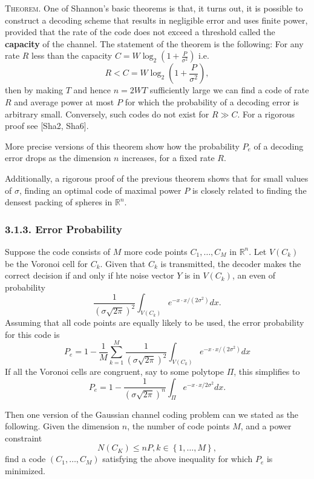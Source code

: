 \documentclass{article}
\newcommand{\R}{\mathbb{R}}
\renewcommand{\=}{\equiv}
\newcommand{\ass}[1]{\left( #1 \right)}
\newcommand{\set}[1]{\left\{ #1 \right\}}
\newcommand{\header}[1]{\vspace{1em}\noindent\textsc{#1.} }
\begin{document}
\header{Theorem}
One of Shannon's basic theorems is that, it turns out, it is possible to construct a decoding scheme that results in negligible error and uses finite power, provided that the rate of the code does not exceed a threshold called the \textbf{capacity} of the channel.
The statement of the theorem is the following:
For any rate $R$ less than the capacity $C = W \log_2 \ass{1 + \frac{P}{\sigma^2}}$ i.e.
$$ R < C = W \log_2 \ass{1 + \frac{P}{\sigma^2}}, $$
then by making $T$ and hence $n = 2WT$ sufficiently large we can find a code of rate $R$ and average power at most $P$ for which the probability of a decoding error is arbitrary small.
Conversely, such codes do not exist for $R \gg C$.
For a rigorous proof see [Sha2, Sha6].

More precise versions of this theorem show how the probability $P_e$ of a decoding error drops as the dimension $n$ increases, for a fixed rate $R$.

Additionally, a rigorous proof of the previous theorem shows that for small values of $\sigma$, finding an optimal code of maximal power $P$ is closely related to finding the densest packing of spheres in $\R^n$.

\subsubsection*{3.1.3. Error Probability}

Suppose the code consists of $M$ more code points $C_1, \dots, C_M$ in $\R^n$.
Let $V(C_k)$ be the Voronoi cell for $C_k$.
Given that $C_k$ is transmitted, the decoder makes the correct decision if and only if hte noise vector $Y$ is in $V(C_k)$, an even of probability
$$ \frac{1}{(\sigma \sqrt{2\pi})^2} \int_{V(C_k)} e^{-x \cdot x/(2\sigma^2)} dx. $$
Assuming that all code points are equally likely to be used, the error probability for this code is
$$ P_e = 1 - \frac{1}{M} \sum_{k=1}^M \frac{1}{(\sigma \sqrt{2\pi})^2} \int_{V(C_k)} e^{-x \cdot x/(2\sigma^2)} dx $$
If all the Voronoi cells are congruent, say to some polytope $\Pi$, this simplifies to
$$ P_e = 1 - \frac{1}{(\sigma \sqrt{2\pi})^n} \int_\Pi e^{-x \cdot x/2\sigma^2} dx. $$

Then one version of the Gaussian channel coding problem can we stated as the following.
Given the dimension $n$, the number of code points $M$, and a power constraint
$$ N(C_K) \leq nP, k \in \set{1, \dots, M}, $$
find a code $(C_1, \dots, C_M)$ satisfying the above inequality for which $P_e$ is minimized.
\end{document}
